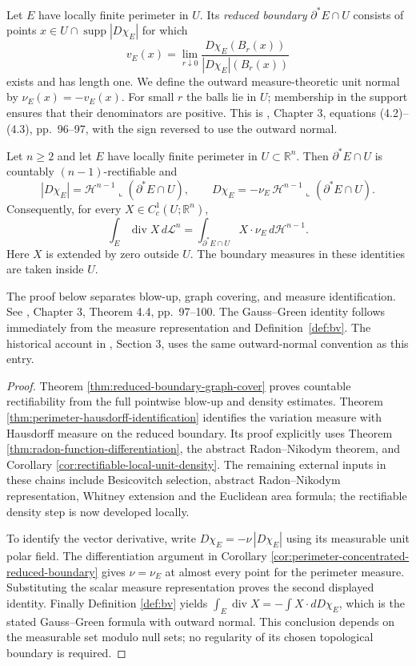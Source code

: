 \begin{definition}\label{def:reduced-boundary}
Let $E$ have locally finite perimeter in $U$. Its \emph{reduced boundary} $\partial^*E\cap U$ consists of points $x\in U\cap\operatorname{supp}|D\chi_E|$ for which
\[
 v_E(x)=\lim_{r\downarrow0}\frac{D\chi_E(B_r(x))}{|D\chi_E|(B_r(x))}
\]
exists and has length one. We define the outward measure-theoretic unit normal by $\nu_E(x)=-v_E(x)$. For small $r$ the balls lie in $U$; membership in the support ensures that their denominators are positive. This is \cite{Sim18}, Chapter 3, equations (4.2)--(4.3), pp.~96--97, with the sign reversed to use the outward normal.
\end{definition}

\begin{theorem}\label{thm:de-giorgi}
Let $n\geq2$ and let $E$ have locally finite perimeter in $U\subset\mathbb{R}^n$. Then $\partial^*E\cap U$ is countably $(n-1)$-rectifiable and
\[
 |D\chi_E|=\mathcal{H}^{n-1}\llcorner(\partial^*E\cap U),
 \qquad D\chi_E=-\nu_E\,\mathcal{H}^{n-1}\llcorner(\partial^*E\cap U).
\]
Consequently, for every $X\in C_c^1(U;\mathbb{R}^n)$,
\[
 \int_E\operatorname{div}X\,d\mathcal{L}^n
 =\int_{\partial^*E\cap U}X\cdot\nu_E\,d\mathcal{H}^{n-1}.
\]
Here $X$ is extended by zero outside $U$. The boundary measures in these identities are taken inside $U$.

The proof below separates blow-up, graph covering, and measure identification. See \cite{Sim18}, Chapter 3, Theorem 4.4, pp.~97--100. The Gauss--Green identity follows immediately from the measure representation and Definition~\ref{def:bv}. The historical account in \cite{Fle16}, Section 3, uses the same outward-normal convention as this entry.
\end{theorem}
\begin{proof}
Theorem \ref{thm:reduced-boundary-graph-cover} proves countable rectifiability from the full pointwise blow-up and density estimates. Theorem \ref{thm:perimeter-hausdorff-identification} identifies the variation measure with Hausdorff measure on the reduced boundary. Its proof explicitly uses Theorem \ref{thm:radon-function-differentiation}, the abstract Radon--Nikodym theorem, and Corollary \ref{cor:rectifiable-local-unit-density}. The remaining external inputs in these chains include Besicovitch selection, abstract Radon--Nikodym representation, Whitney extension and the Euclidean area formula; the rectifiable density step is now developed locally.

To identify the vector derivative, write $D\chi_E=-\nu\,|D\chi_E|$ using its measurable unit polar field. The differentiation argument in Corollary \ref{cor:perimeter-concentrated-reduced-boundary} gives $\nu=\nu_E$ at almost every point for the perimeter measure. Substituting the scalar measure representation proves the second displayed identity. Finally Definition \ref{def:bv} yields $\int_E\operatorname{div}X=-\int X\cdot dD\chi_E$, which is the stated Gauss--Green formula with outward normal. This conclusion depends on the measurable set modulo null sets; no regularity of its chosen topological boundary is required.
\end{proof}

